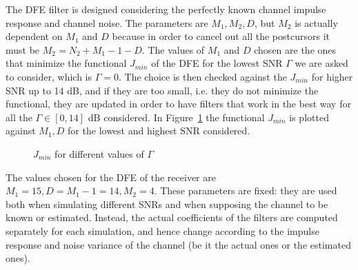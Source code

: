 \documentclass[10pt]{article}
\begin{document}
The DFE filter is designed considering the perfectly known channel impulse response and channel noise. The parameters are $M_1, M_2, D$, but $M_2$ is actually dependent on $M_1$ and $D$ because in order to cancel out all the postcursors it must be $M_2 = N_2 + M_1 - 1 - D$. The values of $M_1$ and $D$ chosen are the ones that minimize the functional $J_{min}$ of the DFE for the lowest SNR $\Gamma$ we are asked to consider, which is $\Gamma = 0$. The choice is then checked against the $J_{min}$ for higher SNR up to 14 dB, and if they are too small, i.e. they do not minimize the functional, they are updated in order to have filters that work in the best way for all the $\Gamma \in [0, 14]$ dB considered. In Figure~\ref{fig:jmin_DFE} the functional $J_{min}$ is plotted against $M_1, D$ for the lowest and highest SNR considered. 
\begin{figure}[h!]
	\centering
	\caption{$J_{min}$ for different values of $\Gamma$}
	\label{fig:jmin_DFE}
\end{figure}

The values chosen for the DFE of the receiver are $M_1 = 15, D = M_1 - 1 = 14, M_2 = 4$. These parameters are fixed: they are used both when simulating different SNRs and when supposing the channel to be known or estimated. Instead, the actual coefficients of the filters are computed separately for each simulation, and hence change according to the impulse response and noise variance of the channel (be it the actual ones or the estimated ones).
\end{document}
